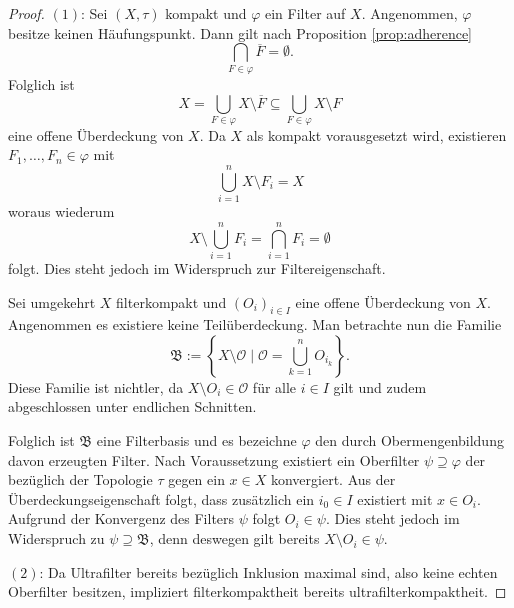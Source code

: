 \begin{proof}
  $(1)$: 
  Sei $(X,\tau)$ kompakt und $\varphi$ ein Filter auf $X$.
  Angenommen, $\varphi$ besitze keinen Häufungspunkt.
  Dann gilt nach Proposition \ref{prop:adherence}
  \begin{displaymath}
    \bigcap_{F \in \varphi} \overline{F} = \emptyset.
  \end{displaymath}
  Folglich ist 
  \begin{displaymath}
    X = \bigcup_{F \in \varphi} X \setminus \overline{F} \subseteq \bigcup_{F \in \varphi} X \setminus F 
  \end{displaymath}
  eine offene Überdeckung von $X$.
  Da $X$ als kompakt vorausgesetzt wird, existieren $F_1,\dots,F_n \in \varphi$ mit
  \begin{displaymath}
    \bigcup_{i = 1}^n X \setminus F_i = X
  \end{displaymath}
  woraus wiederum
  \begin{displaymath}
    X \setminus \bigcup_{i = 1}^n F_i = \bigcap_{i = 1}^n F_i = \emptyset
  \end{displaymath}
  folgt. 
  Dies steht jedoch im Widerspruch zur Filtereigenschaft.

  Sei umgekehrt $X$ filterkompakt und $(O_i)_{i \in I}$ eine offene Überdeckung von $X$.
  Angenommen es existiere keine Teilüberdeckung.
  Man betrachte nun die Familie
  \begin{displaymath}
    \mathfrak{B} := \left\{ X \setminus \mathcal{O} \mid \mathcal{O} = \bigcup_{k = 1}^n O_{i_k}\right\}.
  \end{displaymath}
  Diese Familie ist nichtler, da $X \setminus O_i \in \mathcal{O}$ für alle $i \in I$ gilt und zudem abgeschlossen unter endlichen Schnitten.

  Folglich ist $\mathfrak{B}$ eine Filterbasis und es bezeichne $\varphi$ den durch Obermengenbildung davon erzeugten Filter.
  Nach Voraussetzung existiert ein Oberfilter $\psi \supseteq \varphi$ der bezüglich der Topologie $\tau$ gegen ein $x \in X$ konvergiert.
  Aus der Überdeckungseigenschaft folgt, dass zusätzlich ein $i_0 \in I$ existiert mit $x \in O_i$.
  Aufgrund der Konvergenz des Filters $\psi$ folgt $O_i \in \psi$.
  Dies steht jedoch im Widerspruch zu $\psi \supseteq \mathfrak{B}$, denn deswegen gilt bereits $X \setminus O_i \in \psi$.

  $(2)$: Da Ultrafilter bereits bezüglich Inklusion maximal sind, also keine echten Oberfilter besitzen, impliziert filterkompaktheit bereits ultrafilterkompaktheit.
\end{proof}

